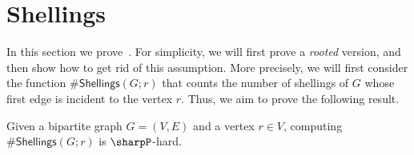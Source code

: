 \documentclass[11pt]{amsart}
\begin{document}
\section{Shellings}

In this section we prove~. For simplicity, we will first prove a \emph{rooted} version, and then show how to get rid of this assumption. More precisely, we will first consider the function $\#\mathsf{Shellings}(G; r)$ that counts the number of shellings of $G$ whose first edge is incident to the vertex $r$. Thus, we aim to prove the following result.
\begin{thm}\label{thm:shellings2}
Given a bipartite graph $G = (V, E)$ and a vertex $r \in V$, 
computing $\#\mathsf{Shellings}(G; r)$ is $\sharpP$-hard.
\end{thm}
\end{document}
